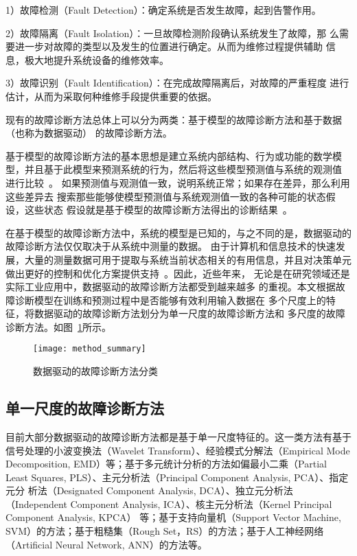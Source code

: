 1）故障检测（Fault Detection）：确定系统是否发生故障，起到告警作用。

2）故障隔离（Fault Isolation）：一旦故障检测阶段确认系统发生了故障，那
么需要进一步对故障的类型以及发生的位置进行确定。从而为维修过程提供辅助
信息，极大地提升系统设备的维修效率。

3）故障识别（Fault Identification）：在完成故障隔离后，对故障的严重程度
进行估计，从而为采取何种维修手段提供重要的依据。

现有的故障诊断方法总体上可以分为两类：基于模型的故障诊断方法和基于数据（也称为数据驱动）
的故障诊断方法。

基于模型的故障诊断方法的基本思想是建立系统内部结构、行为或功能的数学模
型，并且基于此模型来预测系统的行为，然后将这些模型预测值与系统的观测值
进行比较~\cite{console1999model, davis1988model, mosterman1998comprehensive}。
如果预测值与观测值一致，说明系统正常；如果存在差异，那么利用这些差异去
搜索那些能够使模型预测值与系统观测值一致的各种可能的状态假设，这些状态
假设就是基于模型的故障诊断方法得出的诊断结果~\cite{wotawa2000debugging, friedrich1999model}。

在基于模型的故障诊断方法中，系统的模型是已知的，与之不同的是，数据驱动的
故障诊断方法仅仅取决于从系统中测量的数据。 由于计算机和信息技术的快速发
展，大量的测量数据可用于提取与系统当前状态相关的有用信息，并且对决策单元
做出更好的控制和优化方案提供支持~\cite{yin2012comparison}。因此，近些年来，
无论是在研究领域还是实际工业应用中，数据驱动的故障诊断方法都受到越来越多
的重视。本文根据故障诊断模型在训练和预测过程中是否能够有效利用输入数据在
多个尺度上的特征，将数据驱动的故障诊断方法划分为单一尺度的故障诊断方法和
多尺度的故障诊断方法。如图~\ref{fig:method_summary}所示。
\begin{figure}[ht]
  \centering
  \texttt{[image: method\_summary]}
  \caption{数据驱动的故障诊断方法分类}
  \label{fig:method_summary}
\end{figure}

\subsection{单一尺度的故障诊断方法}

目前大部分数据驱动的故障诊断方法都是基于单一尺度特征的。这一类方法有基于
信号处理的小波变换法（Wavelet Transform）、经验模式分解法（Empirical Mode
Decomposition, EMD）等；基于多元统计分析的方法如偏最小二乘（Partial Least
Squares, PLS）、主元分析法（Principal Component Analysis, PCA）、指定元分
析法（Designated Component Analysis, DCA）、独立元分析法（Independent Component
Analysis, ICA）、核主元分析法（Kernel Principal Component Analysis, KPCA）
等；基于支持向量机（Support Vector Machine, SVM）的方法；基于粗糙集（Rough
Set，RS）的方法；基于人工神经网络（Artificial Neural Network, ANN）的方法等。


